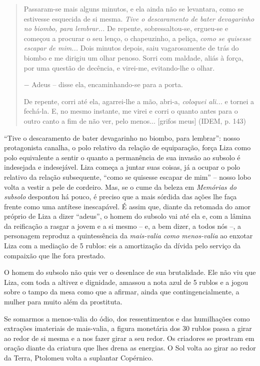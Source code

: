 \begin{quote}
Passaram-se mais alguns minutos, e ela ainda não se levantara, como se
estivesse esquecida de si mesma. \emph{Tive o descaramento de bater
devagarinho no biombo, para lembrar...} De repente, sobressaltou-se,
ergueu-se e começou a procurar o seu lenço, o chapeuzinho, a peliça,
\emph{como se quisesse escapar de mim...} Dois minutos depois, saiu
vagarosamente de trás do biombo e me dirigiu um olhar penoso. Sorri com
maldade, aliás à força, por uma questão de decência, e virei-me,
evitando-lhe o olhar.

− Adeus -- disse ela, encaminhando-se para a porta.

De repente, corri até ela, agarrei-lhe a mão, abri-a, \emph{coloquei
ali...} e tornei a fechá-la. E, no mesmo instante, me virei e corri o
quanto antes para o outro canto a fim de não ver, pelo menos...
{[}grifos meus{]} (IDEM, p. 143)
\end{quote}

``Tive o descaramento de bater devagarinho no biombo, para lembrar'':
nosso protagonista canalha, o polo relativo da relação de equiparação,
força Liza como polo equivalente a sentir o quanto a permanência de sua
invasão ao subsolo é indesejada e indesejável. Liza começa a juntar suas
coisas, já a ocupar o polo relativo da relação subsequente, ``como se
quisesse escapar de mim'' -- nosso lobo volta a vestir a pele de
cordeiro. Mas, se o cume da beleza em \emph{Memórias do subsolo}
despontou há pouco, é preciso que a mais sórdida das ações lhe faça
frente como uma antítese inescapável. É assim que, diante da retomada do
amor próprio de Liza a dizer ``adeus'', o homem do subsolo vai até ela
e, com a lâmina da reificação a rasgar a jovem e a si mesmo -- e, a bem
dizer, a todos nós --, a personagem reproduz a quintessência da
\emph{mais-valia como menos-valia} ao enxotar Liza com a mediação de 5
rublos: eis a amortização da dívida pelo serviço da compaixão que lhe
fora prestado.

O homem do subsolo não quis ver o desenlace de sua brutalidade. Ele não
viu que Liza, com toda a altivez e dignidade, amassou a nota azul de 5
rublos e a jogou sobre o tampo da mesa como que a afirmar, ainda que
contingencialmente, a mulher para muito além da prostituta.

Se somarmos a menos-valia do ódio, dos ressentimentos e das humilhações
como extrações imateriais de mais-valia, a figura monetária dos 30
rublos passa a girar ao redor de si mesma e a nos fazer girar a seu
redor. Os criadores se prostram em oração diante da criatura que lhes
drena as energias. O Sol volta ao girar ao redor da Terra, Ptolomeu
volta a suplantar Copérnico.

